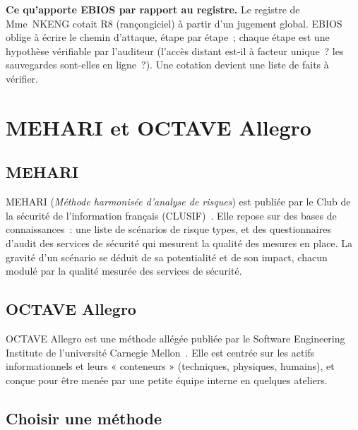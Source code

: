 \begin{boxinfo}
\textbf{Ce qu'apporte EBIOS par rapport au registre.} Le registre de
Mme~NKENG cotait R8 (rançongiciel) à partir d'un jugement global. EBIOS
oblige à écrire le chemin d'attaque, étape par étape~; chaque étape est une
hypothèse vérifiable par l'auditeur (l'accès distant est-il à facteur
unique~? les sauvegardes sont-elles en ligne~?). Une cotation devient une
liste de faits à vérifier.
\end{boxinfo}

\section{MEHARI et OCTAVE Allegro}
\label{sec:c05-autres}

\subsection{MEHARI}

MEHARI (\textit{Méthode harmonisée d'analyse de risques}) est publiée par
le Club de la sécurité de l'information français
(CLUSIF)~\cite{clusif2010mehari}. Elle repose sur des bases de
connaissances~: une liste de scénarios de risque types, et des
questionnaires d'audit des services de sécurité qui mesurent la qualité des
mesures en place. La gravité d'un scénario se déduit de sa potentialité et
de son impact, chacun modulé par la qualité mesurée des services de
sécurité.

\subsection{OCTAVE Allegro}

OCTAVE Allegro est une méthode allégée publiée par le Software Engineering
Institute de l'université Carnegie Mellon~\cite{caralli2007octave}. Elle
est centrée sur les actifs informationnels et leurs « conteneurs »
(techniques, physiques, humains), et conçue pour être menée par une petite
équipe interne en quelques ateliers.

\subsection{Choisir une méthode}

